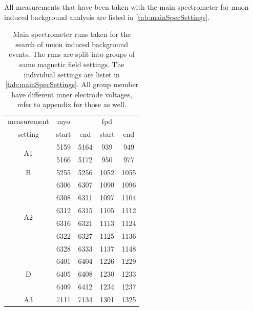   
  
%   

  
All measurements that have been taken with the main spectrometer for muon induced background analysis are listed in \ref{tab:mainSpecSettings}.

\begin{table}
	\centering
	\begin{tabular}{|c|cc|cc|}
		\hline
		measurement & myo & & fpd & \\
		setting& start & end & start & end\\
		\hline
		\multirow{2}{*}{A1} & 5159 & 5164 & 939 & 949 \\
		 & 5166 & 5172 & 950 & 977\\
		\hline
		\multirow{1}{*}{B} &5255 & 5256 & 1052 & 1055\\
		\hline
		\multirow{6}{*}{A2}& 6306 & 6307 & 1090 & 1096\\
		& 6308 & 6311 & 1097 & 1104\\
		& 6312 & 6315 & 1105 & 1112\\
		& 6316 & 6321 & 1113 & 1124\\
		& 6322 & 6327 & 1125 & 1136\\
		& 6328 & 6333 & 1137 & 1148\\
		\hline
		
		\multirow{3}{*}{D}& 6401 & 6404 & 1226 & 1229\\
		& 6405 & 6408 & 1230 & 1233\\
		& 6409 & 6412 & 1234 & 1237\\
		\hline
		
		
		
		A3& 7111 & 7134 & 1301 & 1325\\
		\hline
	\end{tabular}
	\caption[Main spectrometer runs]{Main spectrometer runs taken for the search of muon induced background events. The runs are split into groups of same magnetic field settings. The individual settings are listet in \ref{tab:mainSpecSettings}. All group member have different inner electrode voltages, refer to appendix for those as well.}
	\label{tab:mainSpecRuns}
\end{table}

